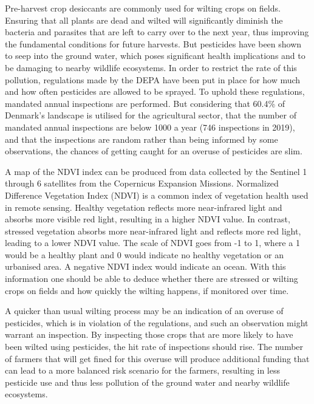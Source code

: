 Pre-harvest crop desiccants are commonly used for wilting crops on fields. Ensuring that all plants are dead and wilted will significantly diminish the bacteria and parasites that are left to carry over to the next year, thus improving the fundamental conditions for future harvests\cite{europaAgriculturePesticidesplant}. But pesticides have been shown to seep into the ground water, which poses significant health implications\cite{pesticiderGrundvand} and to be damaging to nearby wildlife ecosystems\cite{Middeldatabasen}. In order to restrict the rate of this pollution, regulations made by the DEPA have been put in place for how much and how often pesticides are allowed to be sprayed. To uphold these regulations, mandated annual inspections are performed. But considering that 60.4\% of Denmark's landscape is utilised for the agricultural sector\cite{Lindsgaard2017-em}, that the number of mandated annual inspections are below 1000 a year (746 inspections in 2019)\cite{MiljoeOgFoedevareministeriet}, and that the inspections are random rather than being informed by some observations, the chances of getting caught for an overuse of pesticides are slim. 

A map of the NDVI index can be produced from data collected by the Sentinel 1 through 6 satellites from the Copernicus Expansion Missions\cite{noauthor_undated-bb}. Normalized Difference Vegetation Index (NDVI) is a common index of vegetation health used in remote sensing\cite{GISGeography2017-cr}. Healthy vegetation reflects more near-infrared light and absorbs more visible red light, resulting in a higher NDVI value. In contrast, stressed vegetation absorbs more near-infrared light and reflects more red light, leading to a lower NDVI value. The scale of NDVI goes from -1 to 1, where a 1 would be a healthy plant and 0 would indicate no healthy vegetation or an urbanised area. A negative NDVI index would indicate an ocean\cite{GISGeography2017-cr}. With this information one should be able to deduce whether there are stressed or wilting crops on fields and how quickly the wilting happens, if monitored over time. 

A quicker than usual wilting process may be an indication of an overuse of pesticides, which is in violation of the regulations, and such an observation might warrant an inspection. By inspecting those crops that are more likely to have been wilted using pesticides, the hit rate of inspections should rise. The number of farmers that will get fined for this overuse will produce additional funding that can lead to a more balanced risk scenario for the farmers, resulting in less pesticide use and thus less pollution of the ground water and nearby wildlife ecosystems.


